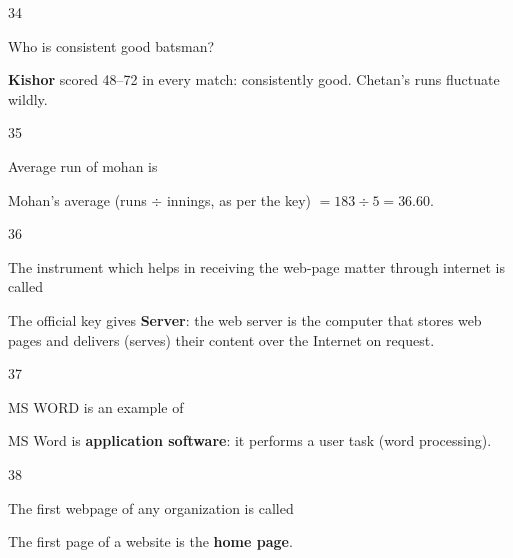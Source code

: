 \begin{question}{34}
{Who is consistent good batsman?\par}
\begin{explain}
\textbf{Kishor} scored 48--72 in every match: consistently good. Chetan's runs fluctuate wildly.
\end{explain}
\end{question}

\begin{question}{35}
{Average run of mohan is\par}
\begin{explain}
Mohan's average (runs $\div$ innings, as per the key) $=183\div5=\mathbf{36.60}$.
\end{explain}
\end{question}

\begin{question}{36}
{The instrument which helps in receiving the web-page matter through internet is called\par}
\begin{explain}
The official key gives \textbf{Server}: the web server is the computer that stores web pages and delivers (serves) their content over the Internet on request.
\end{explain}
\end{question}

\begin{question}{37}
{MS WORD is an example of\par}
\begin{explain}
MS Word is \textbf{application software}: it performs a user task (word processing).
\end{explain}
\end{question}

\begin{question}{38}
{The first webpage of any organization is called\par}
\begin{explain}
The first page of a website is the \textbf{home page}.
\end{explain}
\end{question}

